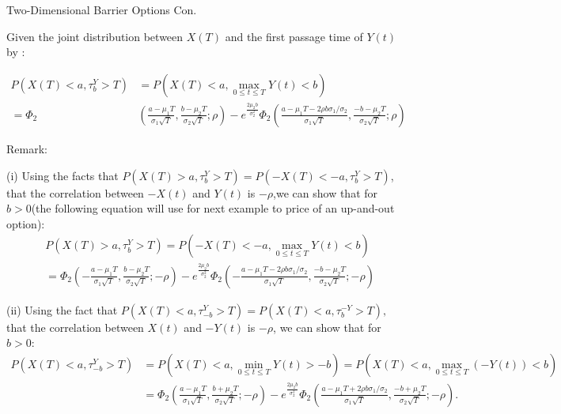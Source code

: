 \documentclass{beamer}
\begin{document}
\begin{frame}{Two-Dimensional Barrier Options Con.}

    {\footnotesize \footnotesize
    \par Given the joint distribution between \( X(T) \) and the first passage time of \( Y(t) \) by :
    \vspace{-1em}
    {\footnotesize \tiny
    \begin{align*}
    P(X(T) < a, \tau_b^Y > T) &= P\left(X(T) < a, \max_{0 \leq t \leq T} Y(t) < b\right) \\
    = \Phi_2 & \left( \frac{a - \mu_1 T}{\sigma_1 \sqrt{T}}, \frac{b - \mu_2 T}{\sigma_2 \sqrt{T}} ; \rho \right) - 
    e^{\frac{2 \mu_2 b}{\sigma_2^2} } \Phi_2 \left( \frac{a - \mu_1 T - 2 \rho b \sigma_1 / \sigma_2}{\sigma_1 \sqrt{T}}, \frac{-b - \mu_2 T}{\sigma_2 \sqrt{T}} ; \rho \right)
    \end{align*}
    \pause
    \par Remark: 
    \par (i) Using the facts that $P(X(T) > a, \tau_b^Y > T) = P(-X(T) < -a, \tau_b^Y > T)$, 
    that the correlation between \(-X(t)\) and \(Y(t)\) is \(-\rho\),we can show that for \(b > 0\)(the following equation will use for next example 
    to price of an up-and-out option):
    \begin{align*}
    &P(X(T) > a, \tau_b^Y > T) = P\left(-X(T) < - a, \max_{0 \leq t \leq T} Y(t) < b\right) \\
    &= \Phi_2 \left( -\frac{a - \mu_1 T}{\sigma_1 \sqrt{T}}, \frac{b - \mu_2 T}{\sigma_2 \sqrt{T}}; -\rho \right)
    - e^{\frac{2 \mu_2 b}{\sigma_2^2} } \Phi_2 \left( -\frac{a - \mu_1 T - 
    2\rho b\sigma_1/\sigma_2}{\sigma_1 \sqrt{T}}, \frac{-b - \mu_2 T}{\sigma_2 \sqrt{T}}; -\rho \right)
    \end{align*}\pause
    \par (ii) Using the fact that $ P(X(T) < a, \tau_{-b}^Y > T) = P(X(T) < a, \tau_b^{-Y} > T),$
     that the correlation between \(X(t)\) and \(-Y(t)\) is \(-\rho\), we can show that for \(b > 0\):
    \begin{align*}
    P(X(T) < a, \tau_{-b}^Y > T) &= P\left(X(T) < a, \min_{0 \leq t \leq T} Y(t) > -b\right) 
    = P\left(X(T) < a, \max_{0 \leq t \leq T} (-Y(t)) < b\right) \\
    &= \Phi_2 \left( \frac{a - \mu_1 T}{\sigma_1 \sqrt{T}}, \frac{b + \mu_2 T}{\sigma_2 \sqrt{T}}; -\rho \right) 
    - e^{\frac{2 \mu_2 b}{\sigma_2^2} }\Phi_2 \left( \frac{a - \mu_1 T + 2\rho b\sigma_1/\sigma_2}{\sigma_1 \sqrt{T}}, \frac{-b + \mu_2 T}{\sigma_2 \sqrt{T}}; -\rho \right).
    \end{align*}
    }
    }
    
\end{frame}
\end{document}
